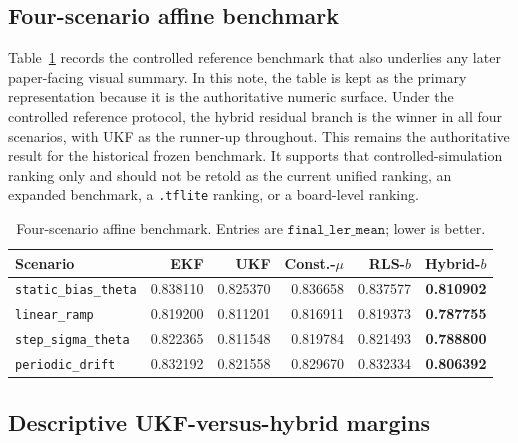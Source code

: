 \documentclass[11pt]{article}
\begin{document}
\subsection{Four-scenario affine benchmark}

Table~\ref{tab:five-mode-benchmark} records the controlled reference benchmark that
also underlies any later paper-facing visual summary.  In this note, the table
is kept as the primary representation because it is the authoritative numeric
surface.  Under the controlled reference protocol, the hybrid residual branch
is the winner in all four scenarios, with UKF as the runner-up throughout.
This remains the authoritative result for the historical frozen benchmark.  It
supports that controlled-simulation ranking only and should not be retold as
the current unified ranking, an expanded benchmark, a \texttt{.tflite} ranking,
or a board-level ranking.

\begin{table}[ht]
\centering
\small
\begin{tabular}{lrrrrr}
\toprule
Scenario & EKF & UKF & Const.-\(\mu\) & RLS-\(b\) & Hybrid-\(b\) \\
\midrule
\texttt{static\_bias\_theta} & 0.838110 & 0.825370 & 0.836658 & 0.837577 & \textbf{0.810902} \\
\texttt{linear\_ramp} & 0.819200 & 0.811201 & 0.816911 & 0.819373 & \textbf{0.787755} \\
\texttt{step\_sigma\_theta} & 0.822365 & 0.811548 & 0.819784 & 0.821493 & \textbf{0.788800} \\
\texttt{periodic\_drift} & 0.832192 & 0.821558 & 0.829670 & 0.832334 & \textbf{0.806392} \\
\bottomrule
\end{tabular}
\caption{Four-scenario affine benchmark.  Entries are
\(\texttt{final\_ler\_mean}\); lower is better.}
\label{tab:five-mode-benchmark}
\end{table}

\subsection{Descriptive UKF-versus-hybrid margins}
\end{document}
